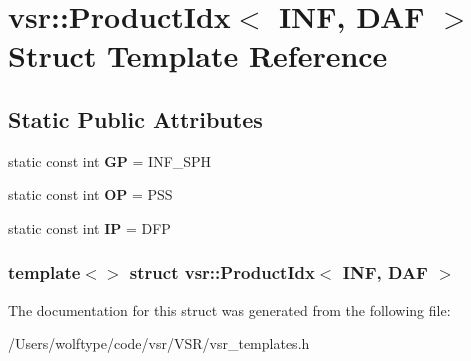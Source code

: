 \hypertarget{structvsr_1_1_product_idx_3_01_i_n_f_00_01_d_a_f_01_4}{\section{vsr\-:\-:Product\-Idx$<$ I\-N\-F, D\-A\-F $>$ Struct Template Reference}
\label{structvsr_1_1_product_idx_3_01_i_n_f_00_01_d_a_f_01_4}
}
\subsection*{Static Public Attributes}
\begin{DoxyCompactItemize}
\item 
\hypertarget{structvsr_1_1_product_idx_3_01_i_n_f_00_01_d_a_f_01_4_acf1928b69577e673c98313e3a041ed1c}{static const int {\bfseries G\-P} = I\-N\-F\-\_\-\-S\-P\-H}\label{structvsr_1_1_product_idx_3_01_i_n_f_00_01_d_a_f_01_4_acf1928b69577e673c98313e3a041ed1c}

\item 
\hypertarget{structvsr_1_1_product_idx_3_01_i_n_f_00_01_d_a_f_01_4_aed3b048f0e9b62752e62bd78366934a8}{static const int {\bfseries O\-P} = P\-S\-S}\label{structvsr_1_1_product_idx_3_01_i_n_f_00_01_d_a_f_01_4_aed3b048f0e9b62752e62bd78366934a8}

\item 
\hypertarget{structvsr_1_1_product_idx_3_01_i_n_f_00_01_d_a_f_01_4_a30a9dbf1605cfcfb6a0c05842490dcdc}{static const int {\bfseries I\-P} = D\-F\-P}\label{structvsr_1_1_product_idx_3_01_i_n_f_00_01_d_a_f_01_4_a30a9dbf1605cfcfb6a0c05842490dcdc}

\end{DoxyCompactItemize}
\subsubsection*{template$<$$>$ struct vsr\-::\-Product\-Idx$<$ I\-N\-F, D\-A\-F $>$}



The documentation for this struct was generated from the following file\-:\begin{DoxyCompactItemize}
\item 
/\-Users/wolftype/code/vsr/\-V\-S\-R/vsr\-\_\-templates.\-h\end{DoxyCompactItemize}
